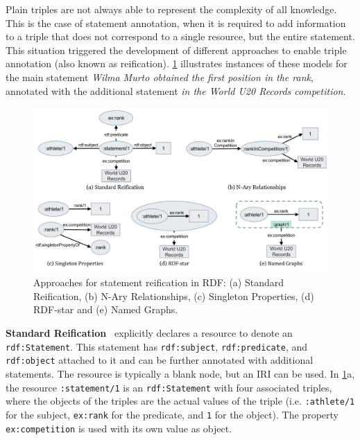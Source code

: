 
Plain triples are not always able to represent the complexity of all knowledge. This is the case of statement annotation, when it is required to add information to a triple that does not correspond to a single resource, but the entire statement. This situation triggered the development of different approaches to enable triple annotation (also known as reification). \cref{fig:chp2_reification} illustrates instances of these models for the main statement \textit{Wilma Murto obtained the first position in the rank}, annotated with the additional statement \textit{in the World U20 Records competition}. 

\begin{figure}[t]
\centering
\includegraphics[width=\linewidth]{figures/chp2_reifications.pdf}
\caption[Approaches for statement reification in RDF]{Approaches for statement reification in RDF: (a) Standard Reification, (b) N-Ary Relationships, (c) Singleton Properties, (d) RDF-star and (e) Named Graphs.}
\label{fig:chp2_reification}
\end{figure}

\noindent\textbf{Standard Reification}~\parencite{lassila1999rdf} explicitly declares a resource to denote an \texttt{rdf:Statement}.
This statement has \texttt{rdf:subject}, \texttt{rdf:predicate}, and \texttt{rdf:object} attached to it and can be further annotated with additional statements. The resource is typically a blank node, but an IRI can be used. 
In \cref{fig:chp2_reification}a, the resource \texttt{:statement/1} is an \texttt{rdf:Statement} with four associated triples, where the objects of the triples are the actual values of the triple (i.e. \texttt{:athlete/1} for the subject, \texttt{ex:rank} for the predicate, and \texttt{1} for the object). The property \texttt{ex:competition} is used with its own value as object.


